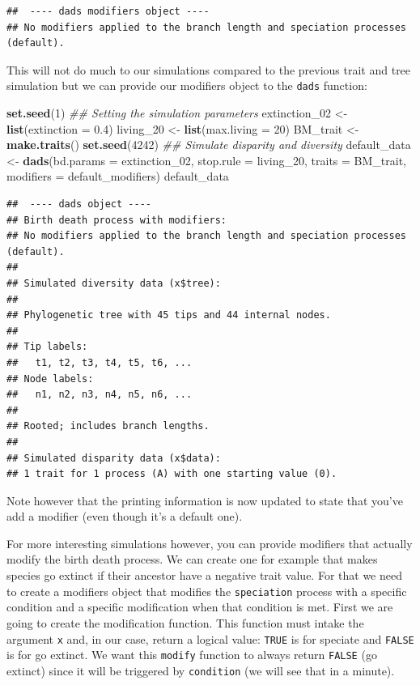 \documentclass[]{book}
\newenvironment{Shaded}{\begin{snugshade}}{\end{snugshade}}
\newcommand{\CommentTok}[1]{\textcolor[rgb]{0.56,0.35,0.01}{\textit{#1}}}
\newcommand{\DataTypeTok}[1]{\textcolor[rgb]{0.13,0.29,0.53}{#1}}
\newcommand{\DecValTok}[1]{\textcolor[rgb]{0.00,0.00,0.81}{#1}}
\newcommand{\FloatTok}[1]{\textcolor[rgb]{0.00,0.00,0.81}{#1}}
\newcommand{\KeywordTok}[1]{\textcolor[rgb]{0.13,0.29,0.53}{\textbf{#1}}}
\newcommand{\NormalTok}[1]{#1}
\newcommand{\StringTok}[1]{\textcolor[rgb]{0.31,0.60,0.02}{#1}}
\begin{document}
\begin{verbatim}
##  ---- dads modifiers object ---- 
## No modifiers applied to the branch length and speciation processes (default).
\end{verbatim}

This will not do much to our simulations compared to the previous trait and tree simulation but we can provide our modifiers object to the \texttt{dads} function:

\begin{Shaded}
\begin{Highlighting}[]
\KeywordTok{set.seed}\NormalTok{(}\DecValTok{1}\NormalTok{)}
\CommentTok{## Setting the simulation parameters}
\NormalTok{extinction_}\DecValTok{02}\NormalTok{ <-}\StringTok{ }\KeywordTok{list}\NormalTok{(}\DataTypeTok{extinction =} \FloatTok{0.4}\NormalTok{)}
\NormalTok{living_}\DecValTok{20}\NormalTok{     <-}\StringTok{ }\KeywordTok{list}\NormalTok{(}\DataTypeTok{max.living =} \DecValTok{20}\NormalTok{)}
\NormalTok{BM_trait      <-}\StringTok{ }\KeywordTok{make.traits}\NormalTok{()}
\KeywordTok{set.seed}\NormalTok{(}\DecValTok{4242}\NormalTok{)}
\CommentTok{## Simulate disparity and diversity}
\NormalTok{default_data <-}\StringTok{ }\KeywordTok{dads}\NormalTok{(}\DataTypeTok{bd.params =}\NormalTok{ extinction_}\DecValTok{02}\NormalTok{,}
                     \DataTypeTok{stop.rule =}\NormalTok{ living_}\DecValTok{20}\NormalTok{,}
                     \DataTypeTok{traits    =}\NormalTok{ BM_trait,}
                     \DataTypeTok{modifiers =}\NormalTok{ default_modifiers)}
\NormalTok{default_data}
\end{Highlighting}
\end{Shaded}

\begin{verbatim}
##  ---- dads object ---- 
## Birth death process with modifiers:
## No modifiers applied to the branch length and speciation processes (default).
## 
## Simulated diversity data (x$tree):
## 
## Phylogenetic tree with 45 tips and 44 internal nodes.
## 
## Tip labels:
##   t1, t2, t3, t4, t5, t6, ...
## Node labels:
##   n1, n2, n3, n4, n5, n6, ...
## 
## Rooted; includes branch lengths.
## 
## Simulated disparity data (x$data):
## 1 trait for 1 process (A) with one starting value (0).
\end{verbatim}

Note however that the printing information is now updated to state that you've add a modifier (even though it's a default one).

For more interesting simulations however, you can provide modifiers that actually modify the birth death process.
We can create one for example that makes species go extinct if their ancestor have a negative trait value.
For that we need to create a modifiers object that modifies the \texttt{speciation} process with a specific condition and a specific modification when that condition is met.
First we are going to create the modification function.
This function must intake the argument \texttt{x} and, in our case, return a logical value: \texttt{TRUE} is for speciate and \texttt{FALSE} is for go extinct.
We want this \texttt{modify} function to always return \texttt{FALSE} (go extinct) since it will be triggered by \texttt{condition} (we will see that in a minute).
\end{document}
